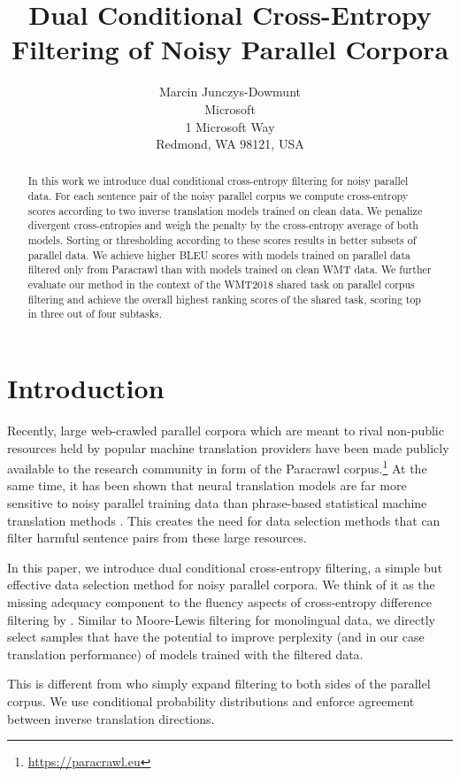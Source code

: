 \documentclass[11pt,a4paper]{article}
\title{Dual Conditional Cross-Entropy Filtering of Noisy Parallel Corpora}
\author{Marcin Junczys-Dowmunt \\
Microsoft \\
1 Microsoft Way\\
Redmond, WA 98121, USA}
\date{}
\begin{document}
\maketitle
\begin{abstract}
In this work we introduce dual conditional cross-entropy filtering for noisy parallel data. For each sentence pair of the noisy parallel corpus we compute cross-entropy scores according to two inverse translation models trained on clean data. We penalize divergent cross-entropies and weigh the penalty by the cross-entropy average of both models. Sorting or thresholding according to these scores results in better subsets of parallel data. We achieve higher BLEU scores with models trained on parallel data filtered only from Paracrawl than with models trained on clean WMT data. We further evaluate our method in the context of the WMT2018 shared task on parallel corpus filtering and achieve the overall highest ranking scores of the shared task, scoring top in three out of four subtasks.
\end{abstract}

\section{Introduction}

Recently, large web-crawled parallel corpora which are meant to rival non-public resources held by popular machine translation providers have been made publicly available to the research community in form of the Paracrawl corpus.\footnote{\url{https://paracrawl.eu}} At the same time, it has been shown that neural translation models are far more sensitive to noisy parallel training data than phrase-based statistical machine translation methods \cite{khayrallah-koehn:2018:WNMT2018,DBLP:journals/corr/abs-1711-02173}. This creates the need for data selection methods that can filter harmful sentence pairs from these large resources.

In this paper, we introduce dual conditional cross-entropy filtering, a simple but effective data selection method for noisy parallel corpora. We think of it as the missing adequacy component to the fluency aspects of cross-entropy difference filtering by .
Similar to Moore-Lewis filtering for monolingual data, we directly select samples that have the potential to improve perplexity (and in our case translation performance) of models trained with the filtered data.

This is different from  who simply expand \citeauthor{moore-lewis:2010:Short} filtering to both sides of the parallel corpus. We use conditional probability distributions and enforce agreement between inverse translation directions. 
\end{document}
